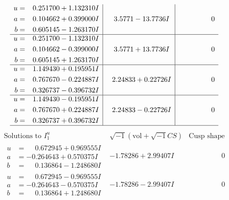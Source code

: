 \documentclass[1p]{elsarticle_modified}
\theoremstyle{definition}
\newcommand{\I}{\sqrt{-1}}
\begin{document}
$$\begin{array}{c|c|c}
\begin{aligned}
u &= \phantom{-}0.251700 + 1.132310 I \\
a &= \phantom{-}0.104662 + 0.399000 I \\
b &= \phantom{-}0.605145 - 1.263170 I\end{aligned}
 & \phantom{-}3.5771 - 13.7736 I & \phantom{-0.000000 } 0 \\ \hline\begin{aligned}
u &= \phantom{-}0.251700 - 1.132310 I \\
a &= \phantom{-}0.104662 - 0.399000 I \\
b &= \phantom{-}0.605145 + 1.263170 I\end{aligned}
 & \phantom{-}3.5771 + 13.7736 I & \phantom{-0.000000 } 0 \\ \hline\begin{aligned}
u &= \phantom{-}1.149430 + 0.195951 I \\
a &= \phantom{-}0.767670 - 0.224887 I \\
b &= \phantom{-}0.326737 - 0.396732 I\end{aligned}
 & \phantom{-}2.24833 + 0.22726 I & \phantom{-0.000000 } 0 \\ \hline\begin{aligned}
u &= \phantom{-}1.149430 - 0.195951 I \\
a &= \phantom{-}0.767670 + 0.224887 I \\
b &= \phantom{-}0.326737 + 0.396732 I\end{aligned}
 & \phantom{-}2.24833 - 0.22726 I & \phantom{-0.000000 } 0\\
 \hline 
 \end{array}$$\newpage$$\begin{array}{c|c|c}  
\text{Solutions to }I^u_{1}& \I (\text{vol} + \sqrt{-1}CS) & \text{Cusp shape}\\
 \hline 
\begin{aligned}
u &= \phantom{-}0.672945 + 0.969555 I \\
a &= -0.264643 + 0.570375 I \\
b &= \phantom{-}0.136864 - 1.248680 I\end{aligned}
 & -1.78286 + 2.99407 I & \phantom{-0.000000 } 0 \\ \hline\begin{aligned}
u &= \phantom{-}0.672945 - 0.969555 I \\
a &= -0.264643 - 0.570375 I \\
b &= \phantom{-}0.136864 + 1.248680 I\end{aligned}
 & -1.78286 - 2.99407 I & \phantom{-0.000000 } 0 \\ \hline\begin{aligned}

\end{aligned}
\end{array}$$
\end{document}
